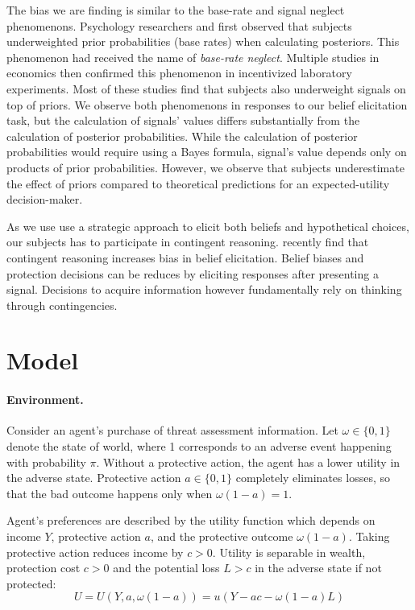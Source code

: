 \documentclass[12pt,a4paper]{article}
\begin{document}
The bias we are finding is similar to the base-rate and signal neglect phenomenons. Psychology researchers \citet{hammerton_case_1973} and \citet{kahneman_psychology_1973} first observed that subjects underweighted prior probabilities (base rates) when calculating posteriors. This phenomenon had received the name of \textit{base-rate neglect}. Multiple studies in economics then confirmed \citep*{grether_testing_1992, holt_update_2009} this phenomenon in incentivized laboratory experiments. Most of these studies find that subjects also underweight signals on top of priors.  We observe both phenomenons in responses to our belief elicitation task, but the calculation of signals' values differs substantially from the calculation of posterior probabilities. While the calculation of posterior probabilities would require using a Bayes formula, signal's value depends only on products of prior probabilities. However, we observe that subjects underestimate the effect of priors compared to theoretical predictions for an expected-utility decision-maker.

As we use use a strategic approach to elicit both beliefs and hypothetical choices, our subjects has to participate in contingent reasoning. \citet{aina_contingent_2023} recently find that contingent reasoning increases bias in belief elicitation. Belief biases and protection decisions can be reduces by eliciting responses after presenting a signal. Decisions to acquire information however fundamentally rely on thinking through contingencies.

\vspace{20pt}
\section{Model}
\paragraph{Environment.} Consider an agent's purchase of threat assessment information. Let $\omega \in \{0,1\}$ denote the state of world, where 1 corresponds to an adverse event happening with probability $\pi$. Without a protective action, the agent has a lower utility in the adverse state. Protective action $a\in\{0,1\}$ completely eliminates losses, so that the bad outcome happens only when $\omega(1-a)=1$.

Agent's preferences are described by the utility function which depends on income $Y$, protective action $a$, and the protective outcome $\omega(1-a)$. Taking protective action reduces income by $c>0$. Utility is separable in wealth, protection cost $c>0$ and the potential loss $L>c$ in the adverse state if not protected:
\begin{equation}
U=U(Y,a,\omega(1-a))=u(Y-ac-\omega(1-a)L)
\end{equation}
\end{document}
